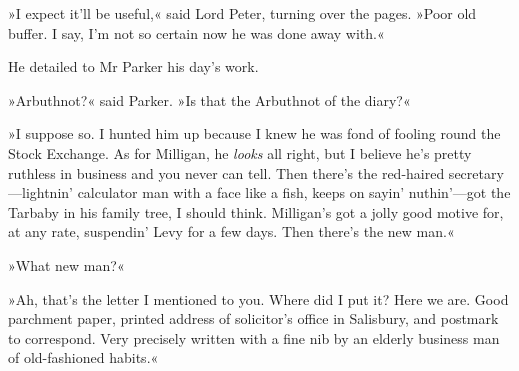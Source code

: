 »I expect it'll be useful,« said Lord Peter, turning over the pages. »Poor old buffer. I say, I'm not so certain now he was done away with.«

He detailed to Mr Parker his day's work.

»Arbuthnot?« said Parker. »Is that the Arbuthnot of the diary?«

»I suppose so. I hunted him up because I knew he was fond of fooling round the Stock Exchange. As for Milligan, he \textit{looks} all right, but I believe he's pretty ruthless in business and you never can tell. Then there's the red-haired secretary\allowbreak---\allowbreak lightnin' calculator man with a face like a fish, keeps on sayin' nuthin'---got the Tarbaby in his family tree, I should think. Milligan's got a jolly good motive for, at any rate, suspendin' Levy for a few days. Then there's the new man.«

»What new man?«

»Ah, that's the letter I mentioned to you. Where did I put it? Here we are. Good parchment paper, printed address of solicitor's office in Salisbury, and postmark to correspond. Very precisely written with a fine nib by an elderly business man of old-fashioned habits.«

